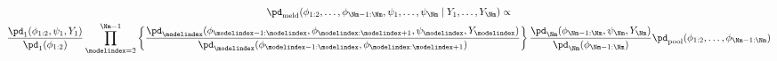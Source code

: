 \begin{multline}
  \pd_{\text{meld}}(\phi_{1:2}, \ldots, \phi_{\Nm - 1:\Nm}, \psi_{1}, \ldots, \psi_{\Nm} \mid Y_{1}, \ldots, Y_{\Nm}) \propto \\ 
  \frac {
      \pd_{1} (\phi_{1:2}, \psi_{1}, Y_{1})
    } {
      \pd_{1}(\phi_{1:2})
    }
  \prod_{\modelindex = 2}^{\Nm - 1} \left\{
    \frac {
      \pd_{\modelindex} (\phi_{\modelindex - 1:\modelindex}, \phi_{\modelindex:\modelindex + 1}, \psi_{\modelindex}, Y_{\modelindex})
    } {
      \pd_{\modelindex}(\phi_{\modelindex - 1:\modelindex}, \phi_{\modelindex:\modelindex + 1})
    }
  \right\}
  \frac {
    \pd_{\Nm} (\phi_{\Nm - 1:\Nm}, \psi_{\Nm}, Y_{\Nm})
  } {
    \pd_{\Nm}(\phi_{\Nm - 1:\Nm})
  }
  \pd_{\text{pool}}(\phi_{1:2}, \ldots, \phi_{\Nm - 1:\Nm}) 
  \label{eqn:dc-final-target}
\end{multline}